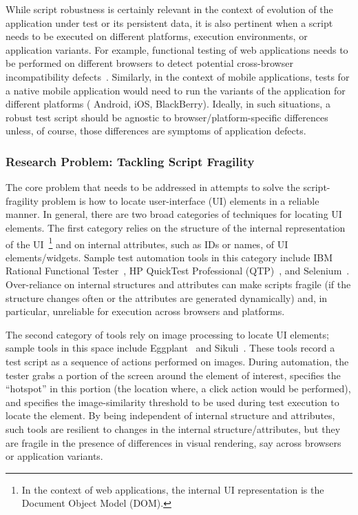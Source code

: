 
While script robustness is certainly relevant in the context of evolution of the
application under test or its persistent data, it is also pertinent when a
script needs to be executed on different platforms, execution environments, or
application variants. For example, functional testing of web applications needs
to be performed on different browsers to detect potential cross-browser
incompatibility
defects~\cite{Choudhary2010,Shauvik:2012,Choudhary:2013,Mesbah:2011}. Similarly,
in the context of mobile applications, tests for a native mobile application
would need to run the variants of the application for different platforms (\eg
Android, iOS, BlackBerry). Ideally, in such situations, a robust test script
should be agnostic to browser/platform-specific differences unless, of course,
those differences are symptoms of application defects.

\subsubsection*{Research Problem: Tackling Script Fragility}

The core problem that needs to be addressed in attempts to solve the
script-fragility problem is how to locate user-interface (UI) elements in a
reliable manner. In general, there are two broad categories of techniques for
locating UI elements. The first category relies on the structure of the internal
representation of the UI~\footnote{\small In the context of web applications,
  the internal UI representation is the Document Object Model (DOM).} and on
internal attributes, such as IDs or names, of UI elements/widgets. Sample test
automation tools in this category include IBM Rational Functional
Tester~\cite{ibmrft}, HP QuickTest Professional (QTP)~\cite{hpqtp}, and
Selenium~\cite{selenium}. Over-reliance on internal structures and attributes
can make scripts fragile (\eg if the structure changes often or the attributes
are generated dynamically) and, in particular, unreliable for execution across
browsers and platforms.

The second category of tools rely on image processing to locate UI elements;
sample tools in this space include Eggplant~\cite{Eggplant} and
Sikuli~\cite{Chang:2010, Yeh:2009}. These tools record a test script as a
sequence of actions performed on images. During automation, the tester grabs a
portion of the screen around the element of interest, specifies the ``hotspot''
in this portion (the location where, \eg a click action would be performed), and
specifies the image-similarity threshold to be used during test execution to
locate the element. By being independent of internal structure and attributes,
such tools are resilient to changes in the internal structure/attributes, but
they are fragile in the presence of differences in visual rendering, say across
browsers or application variants.

